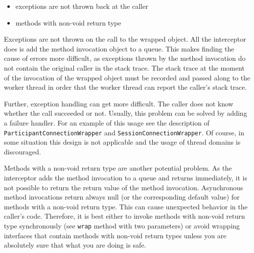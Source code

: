 \begin{itemize}
 \item exceptions are not thrown back at the caller
 \item methods with non-void return type
\end{itemize}

Exceptions are not thrown on the call to the wrapped object. All the 
interceptor does is add the method invocation object to a queue. This makes
finding the cause of errors more difficult, as exceptions thrown by the
method invocation do not contain the original caller in the stack trace.
The stack trace at the moment of the invocation of the wrapped object must
be recorded and passed along to the worker thread in order that the worker
thread can report the caller's stack trace. 

Further, exception handling can get more difficult. The caller does not
know whether the call succeeded or not. Usually, this problem can be solved
by adding a failure handler. For an example of this usage see the
description of \texttt{ParticipantConnectionWrapper} and 
\texttt{SessionConnectionWrapper}. Of course, in some situation this
design is not applicable and the usage of thread domains is discouraged.

Methods with a non-void return type are another potential problem. As the
interceptor adds the method invocation to a queue and returns immediately,
it is not possible to return the return value of the method invocation.
Asynchronous method invocations return always null (or the corresponding
default value) for methods with a non-void return type. This can cause
unexpected behavior in the caller's code. Therefore, it is best either to
invoke methods with non-void return type synchronously (see \texttt{wrap}
method with two parameters) or avoid wrapping interfaces that contain
methods with non-void return types unless you are absolutely sure that
what you are doing is safe.


